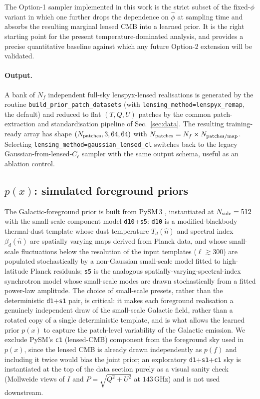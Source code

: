 \documentclass[11pt]{article}
\theoremstyle{definition}
\begin{document}
The Option-1 sampler implemented in this work is the strict subset of the fixed-$\phi$ variant in which one further drops the dependence on $\hat\phi$ at sampling time and absorbs the resulting marginal lensed CMB into a learned prior. It is the right starting point for the present temperature-dominated analysis, and provides a precise quantitative baseline against which any future Option-2 extension will be validated.

\paragraph{Output.}
A bank of $N_f$ independent full-sky lenspyx-lensed realisations is generated by the routine \texttt{build\_prior\_patch\_datasets} (with \texttt{lensing\_method=\textquotesingle lenspyx\_remap\textquotesingle}, the default) and reduced to flat $(T,Q,U)$ patches by the common patch-extraction and standardisation pipeline of Sec.~\ref{sec:data}. The resulting training-ready array has shape $(N_{\rm patches},3,64,64)$ with $N_{\rm patches}=N_f\times N_{\rm patches/map}$. Selecting \texttt{lensing\_method=\textquotesingle gaussian\_lensed\_cl\textquotesingle} switches back to the legacy Gaussian-from-lensed-$C_\ell$ sampler with the same output schema, useful as an ablation control.

\subsection{\texorpdfstring{$p(x)$}{p(x)}: simulated foreground priors}
\label{sec:data_prior_x}

The Galactic-foreground prior is built from PySM\,3 \cite{thorne2017pysm,zonca2021pysm3}, instantiated at $N_{\rm side}=512$ with the small-scale component model \texttt{d10}+\texttt{s5}: \texttt{d10} is a modified-blackbody thermal-dust template whose dust temperature $T_d(\hat n)$ and spectral index $\beta_d(\hat n)$ are spatially varying maps derived from Planck data, and whose small-scale fluctuations below the resolution of the input templates ($\ell\!\gtrsim\!300$) are populated stochastically by a non-Gaussian small-scale model fitted to high-latitude Planck residuals; \texttt{s5} is the analogous spatially-varying-spectral-index synchrotron model whose small-scale modes are drawn stochastically from a fitted power-law amplitude. The choice of small-scale presets, rather than the deterministic \texttt{d1}+\texttt{s1} pair, is critical: it makes each foreground realisation a genuinely independent draw of the small-scale Galactic field, rather than a rotated copy of a single deterministic template, and is what allows the learned prior $p(x)$ to capture the patch-level variability of the Galactic emission. We exclude PySM's \texttt{c1} (lensed-CMB) component from the foreground sky used in $p(x)$, since the lensed CMB is already drawn independently as $p(f)$ and including it twice would bias the joint prior; an exploratory \texttt{d1}+\texttt{s1}+\texttt{c1} sky is instantiated at the top of the data section purely as a visual sanity check (Mollweide views of $I$ and $P=\sqrt{Q^2+U^2}$ at $143\,\mathrm{GHz}$) and is not used downstream.
\end{document}
